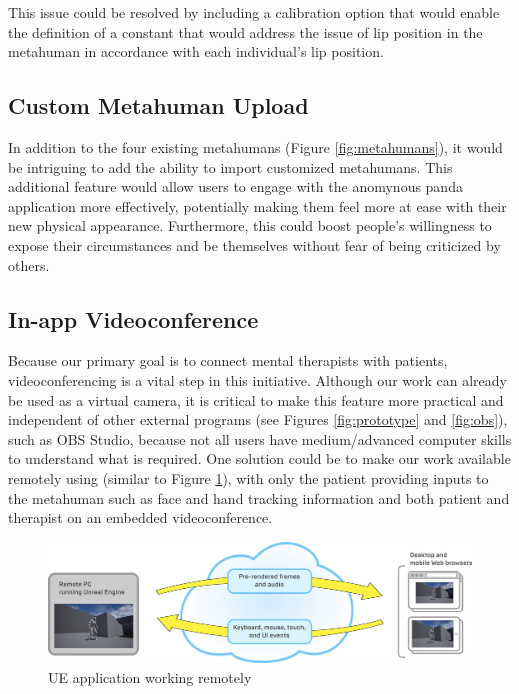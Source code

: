 This issue could be resolved by including a calibration option that would enable the definition of a constant that would address the issue of lip position in the metahuman in accordance with each individual's lip position. 

\subsection{Custom Metahuman Upload}
In addition to the four existing metahumans (Figure \ref{fig:metahumans}), it would be intriguing to add the ability to import customized metahumans. This additional feature would allow users to engage with the anomynous panda application more effectively, potentially making them feel more at ease with their new physical appearance. Furthermore, this could boost people's willingness to expose their circumstances and be themselves without fear of being criticized by others.

\subsection{In-app Videoconference}
Because our primary goal is to connect mental therapists with patients, videoconferencing is a vital step in this initiative. Although our work can already be used as a virtual camera, it is critical to make this feature more practical and independent of other external programs (see Figures \ref{fig:prototype} and \ref{fig:obs}), such as OBS Studio, because not all users have medium/advanced computer skills to understand what is required. One solution could be to make our work available remotely using \cite{PIXUE} (similar to Figure \ref{fig:cloud}), with only the patient providing inputs to the metahuman such as face and hand tracking information and both patient and therapist on an embedded videoconference. 

\begin{figure}[!htb]
\includegraphics[width=\textwidth]{figures/cloud-simplified.png}
\centering
\caption{UE application working remotely \cite{PIXUE}}
\label{fig:cloud}
\end{figure}

